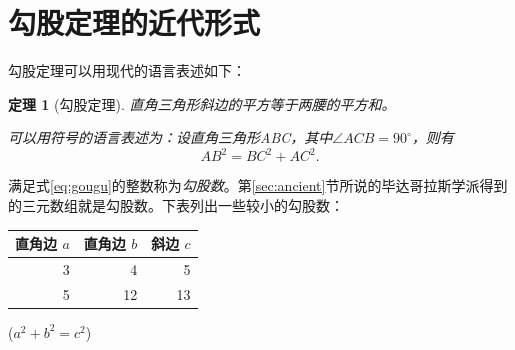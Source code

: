 \documentclass[UTF8] {ctexart}
\begin{document}
\section{勾股定理的近代形式}
勾股定理可以用现代的语言表述如下：
\newtheorem{thm}{定理}
\begin{thm}[勾股定理]
    直角三角形斜边的平方等于两腰的平方和。

    可以用符号的语言表述为：设直角三角形ABC，其中$\angle ACB = 90^\circ$，则有   %
\begin{equation}\label{eq:gougu}
    AB^2 = BC^2 + AC^2.
\end{equation}
\end{thm}
满足式\eqref{eq:gougu}的整数称为\emph{勾股数}。第\ref{sec:ancient}节所说的毕达哥拉斯学派得到的三元数组就是勾股数。下表列出一些较小的勾股数：
\begin{table}[H]   %

\begin{tabular}{|rrr|}  %
\hline  %
直角边 $a$ & 直角边 $b$ & 斜边 $c$ \\   %
\hline
3 &  4 &  5 \\
5 & 12 & 13 \\
\hline
\end{tabular}%
\qquad  %
($a^2 + b^2 = c^2$)
\end{table}

\nocite{Shiye}      %
\end{document}
